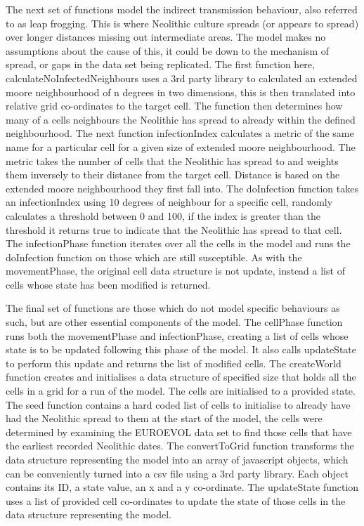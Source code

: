 The next set of functions model the indirect transmission behaviour, also referred to as leap frogging. This is where Neolithic culture spreads (or appears to spread) over longer distances missing out intermediate areas. The model makes no assumptions about the cause of this, it could be down to the mechanism of spread, or gaps in the data set being replicated. The first function here, calculateNoInfectedNeighbours uses a 3rd party library to calculated an extended moore neighbourhood of n degrees in two dimensions, this is then translated into relative grid co-ordinates to the target cell. The function then determines how many of a cells neighbours the Neolithic has spread to already within the defined neighbourhood. The next function infectionIndex calculates a metric of the same name for a particular cell for a given size of extended moore neighbourhood. The metric takes the number of cells that the Neolithic has spread to and weights them inversely to their distance from the target cell. Distance is based on the extended moore neighbourhood they first fall into. The doInfection function takes an infectionIndex using 10 degrees of neighbour for a specific cell, randomly calculates a threshold between 0 and 100, if the index is greater than the threshold it returns true to indicate that the Neolithic has spread to that cell. The infectionPhase function iterates over all the cells in the model and runs the doInfection function on those which are still susceptible. As with the movementPhase, the original cell data structure is not update, instead a list of cells whose state has been modified is returned.

The final set of functions are those which do not model specific behaviours as such, but are other essential components of the model. The cellPhase function runs both the movementPhase and infectionPhase, creating a list of cells whose state is to be updated following this phase of the model. It also calls updateState to perform this update and returns the list of modified cells. The createWorld function creates and initialises a data structure of specified size that holds all the cells in a grid for a run of the model. The cells are initialised to a provided state. The seed function contains a hard coded list of cells to initialise to already have had the Neolithic spread to them at the start of the model, the cells were determined by examining the EUROEVOL data set to find those cells that have the earliest recorded Neolithic dates. The convertToGrid function transforms the data structure representing the model into an array of javascript objects, which can be conveniently turned into a csv file using a 3rd party library. Each object contains its ID, a state value, an x and a y co-ordinate. The updateState function uses a list of provided cell co-ordinates to update the state of those cells in the data structure representing the model. 

